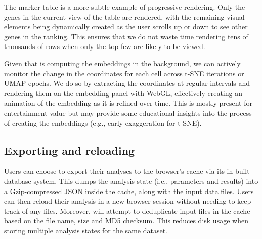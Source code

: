 \documentclass{article}
\begin{document}
The marker table is a more subtle example of progressive rendering.
Only the genes in the current view of the table are rendered, with the remaining visual elements being dynamically created as the user scrolls up or down to see other genes in the ranking.
This ensures that we do not waste time rendering tens of thousands of rows when only the top few are likely to be viewed.

Given that  is computing the embeddings in the background, we can actively monitor the change in the coordinates for each cell across t-SNE iterations or UMAP epochs.
We do so by extracting the coordinates at regular intervals and rendering them on the embedding panel with WebGL,
effectively creating an animation of the embedding as it is refined over time.
This is mostly present for entertainment value but may provide some educational insights into the process of creating the embeddings (e.g., early exaggeration for t-SNE).

% 

\subsection{Exporting and reloading}

Users can choose to export their analyses to the browser's cache via its in-built  database system.
This dumps the analysis state (i.e., parameters and results) into a Gzip-compressed JSON inside the cache, along with the input data files.
Users can then reload their analysis in a new browser session without needing to keep track of any files.
Moreover,  will attempt to deduplicate input files in the cache based on the file name, size and MD5 checksum.
This reduces disk usage when storing multiple analysis states for the same dataset. 
\end{document}
